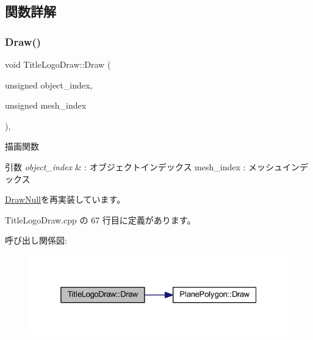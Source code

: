 \subsection{関数詳解}
\mbox{\label{class_title_logo_draw_a01e4cb21d580bac86a226fa2e35bf4a3}} 
\subsubsection{\texorpdfstring{Draw()}{Draw()}}
{\footnotesize\ttfamily void Title\+Logo\+Draw\+::\+Draw (\begin{DoxyParamCaption}\item[{unsigned}]{object\+\_\+index,  }\item[{unsigned}]{mesh\+\_\+index }\end{DoxyParamCaption})\hspace{0.3cm}{\ttfamily [override]}, {\ttfamily [virtual]}}



描画関数 


\begin{DoxyParams}{引数}
{\em object\+\_\+index} & \+: オブジェクトインデックス mesh\+\_\+index \+: メッシュインデックス \\
\hline
\end{DoxyParams}


\mbox{\hyperlink{class_draw_null_afe50f6fd820b18d673f70f048743f339}{Draw\+Null}}を再実装しています。



 Title\+Logo\+Draw.\+cpp の 67 行目に定義があります。

呼び出し関係図\+:\nopagebreak
\begin{figure}[H]
\begin{center}
\leavevmode
\includegraphics[width=325pt]{class_title_logo_draw_a01e4cb21d580bac86a226fa2e35bf4a3_cgraph}
\end{center}
\end{figure}
\mbox{\label{class_title_logo_draw_ab727012424a02249a90a0f7d247371a8}} 
